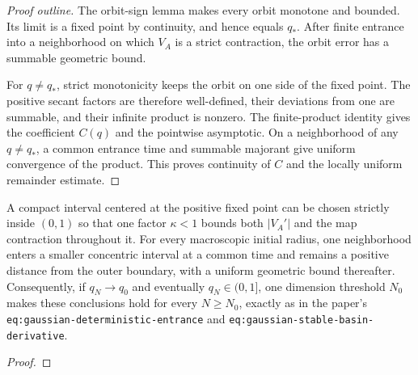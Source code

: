 \begin{proof}[Proof outline]
  \leanok
  The orbit-sign lemma makes every orbit monotone and bounded. Its limit is a
  fixed point by continuity, and hence equals $q_\ast$. After finite entrance
  into a neighborhood on which $V_A$ is a strict contraction, the orbit error
  has a summable geometric bound.

  For $q\ne q_\ast$, strict monotonicity keeps the orbit on one side of the
  fixed point. The positive secant factors are therefore well-defined, their
  deviations from one are summable, and their infinite product is nonzero.
  The finite-product identity gives the coefficient $C(q)$ and the pointwise
  asymptotic. On a neighborhood of any $q\ne q_\ast$, a common entrance time
  and summable majorant give uniform convergence of the product. This proves
  continuity of $C$ and the locally uniform remainder estimate.
\end{proof}

\begin{lemma}
  \label{lem:gaussian-deterministic-entrance}
  \leanok
  A compact interval centered at the positive fixed point can be chosen
  strictly inside $(0,1)$ so that one factor $\kappa<1$ bounds both
  $|V_A'|$ and the map contraction throughout it. For every macroscopic
  initial radius, one neighborhood enters a smaller concentric interval at a
  common time and remains a positive distance from the outer boundary, with a
  uniform geometric bound thereafter. Consequently, if $q_N\to q_0$ and
  eventually $q_N\in(0,1]$, one dimension threshold $N_0$ makes these
  conclusions hold for every $N\ge N_0$, exactly as in the paper's
  \texttt{eq:gaussian-deterministic-entrance} and
  \texttt{eq:gaussian-stable-basin-derivative}.
\end{lemma}
\begin{proof}\leanok{}\end{proof}

